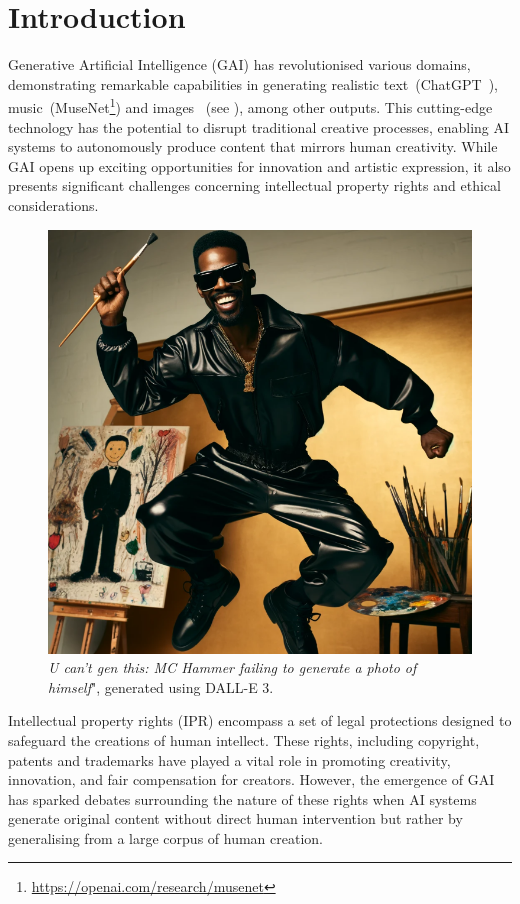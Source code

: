 \documentclass[conference,table]{IEEEtran} %
\begin{document}
\section{Introduction}
Generative Artificial Intelligence (GAI) has revolutionised various domains, demonstrating remarkable capabilities in generating realistic text~(ChatGPT~\cite{openai_gpt-4_2023}),
music~(MuseNet\footnote{\url{https://openai.com/research/musenet}}) and images~\cite{rombach_high-resolution_2022,ramesh_hierarchical_2022} (see ),  among other outputs. %
This cutting-edge technology has the potential to disrupt traditional creative processes, enabling AI systems to autonomously produce content that mirrors human creativity. 
While GAI opens up exciting opportunities for innovation and artistic expression, it also presents significant challenges concerning intellectual property rights and ethical considerations.
\begin{figure}[ht]
    \centering
    \includegraphics[width=\linewidth]{figures/mchammer.png}
    \caption[]{\textit{U can't gen this: MC Hammer failing to generate a photo of himself}", generated using DALL-E 3\footnotemark.
    } 
    \label{fig:introduction}
\end{figure}
Intellectual property rights (IPR) encompass a set of legal protections designed to safeguard the creations of human intellect. These rights, including copyright, patents and trademarks have played a vital role in promoting creativity, innovation, and fair compensation for creators. However, the emergence of GAI has sparked debates surrounding the nature of these rights when AI systems generate original content without direct human intervention but rather by generalising from a large corpus of human creation.
\end{document}

